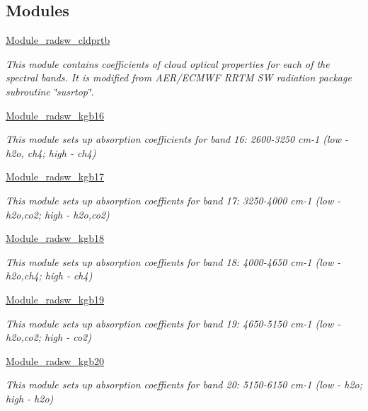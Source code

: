 \subsection*{Modules}
\begin{DoxyCompactItemize}
\item 
\hyperlink{group__module__radsw__cldprtb}{Module\+\_\+radsw\+\_\+cldprtb}
\begin{DoxyCompactList}\small\item\em This module contains coefficients of cloud optical properties for each of the spectral bands. It is modified from A\+E\+R/\+E\+C\+M\+WF R\+R\+TM SW radiation package subroutine \char`\"{}susrtop\char`\"{}. \end{DoxyCompactList}\item 
\hyperlink{group__module__radsw__kgb16}{Module\+\_\+radsw\+\_\+kgb16}
\begin{DoxyCompactList}\small\item\em This module sets up absorption coefficients for band 16\+: 2600-\/3250 cm-\/1 (low -\/ h2o, ch4; high -\/ ch4) \end{DoxyCompactList}\item 
\hyperlink{group__module__radsw__kgb17}{Module\+\_\+radsw\+\_\+kgb17}
\begin{DoxyCompactList}\small\item\em This module sets up absorption coeffients for band 17\+: 3250-\/4000 cm-\/1 (low -\/ h2o,co2; high -\/ h2o,co2) \end{DoxyCompactList}\item 
\hyperlink{group__module__radsw__kgb18}{Module\+\_\+radsw\+\_\+kgb18}
\begin{DoxyCompactList}\small\item\em This module sets up absorption coeffients for band 18\+: 4000-\/4650 cm-\/1 (low -\/ h2o,ch4; high -\/ ch4) \end{DoxyCompactList}\item 
\hyperlink{group__module__radsw__kgb19}{Module\+\_\+radsw\+\_\+kgb19}
\begin{DoxyCompactList}\small\item\em This module sets up absorption coeffients for band 19\+: 4650-\/5150 cm-\/1 (low -\/ h2o,co2; high -\/ co2) \end{DoxyCompactList}\item 
\hyperlink{group__module__radsw__kgb20}{Module\+\_\+radsw\+\_\+kgb20}
\begin{DoxyCompactList}\small\item\em This module sets up absorption coeffients for band 20\+: 5150-\/6150 cm-\/1 (low -\/ h2o; high -\/ h2o) \end{DoxyCompactList}\item 

\end{DoxyCompactItemize}

